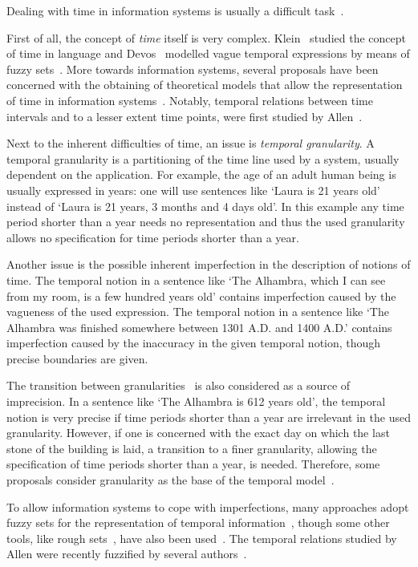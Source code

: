 Dealing with time in information systems is usually a difficult task~\cite{Bolour82}.

First of all, the concept of \emph{time} itself is very complex. Klein~\cite{klein94} studied the concept of time in language and Devos~\cite{devos94} modelled vague temporal expressions by means of fuzzy sets~\cite{zadeh65}. More towards information systems, several proposals have been concerned with the obtaining of theoretical models that allow the representation of time in information systems~\cite{cruyssen97,devos98,Cru97}. Notably, temporal relations between time intervals and to a lesser extent time points, were first studied by Allen~\cite{Allen83}.

Next to the inherent difficulties of time, an issue is \emph{temporal granularity}. A temporal granularity is a partitioning of the time line used by a system, usually dependent on the application. For example, the age of an adult human being is usually expressed in years: one will use sentences like `Laura is 21 years old' instead of `Laura is 21 years, 3 months and 4 days old'. In this example any time period shorter than a year needs no representation and thus the used granularity allows no specification for time periods shorter than a year.

Another issue is the possible inherent imperfection in the description of notions of time. The temporal notion in a sentence like `The Alhambra, which I can see from my room, is a few hundred years old' contains imperfection caused by the vagueness of the used expression. The temporal notion in a sentence like `The Alhambra was finished somewhere between 1301 A.D. and 1400 A.D.' contains imperfection caused by the inaccuracy in the given temporal notion, though precise boundaries are given.

The transition between granularities~\cite{Lin97} is also considered as a source of imprecision. In a sentence like `The Alhambra is 612 years old', the temporal notion is very precise if time periods shorter than a year are irrelevant in the used granularity. However, if one is concerned with the exact day on which the last stone of the building is laid, a transition to a finer granularity, allowing the specification of time periods shorter than a year, is needed. Therefore, some proposals consider granularity as the base of the temporal model~\cite{Cru97}.

To allow information systems to cope with imperfections, many approaches adopt fuzzy sets for the representation of temporal information~\cite{Virant199639,35337,343607,nagypal03,Dubois:jucs_9_9:fuzziness_and_uncertainty_in}, though some other tools, like rough sets~\cite{pawlak95}, have also been used~\cite{Qia09}. The temporal relations studied by Allen were recently fuzzified by several authors~\cite{ohlbach04,nagypal03,schockaert08}.



